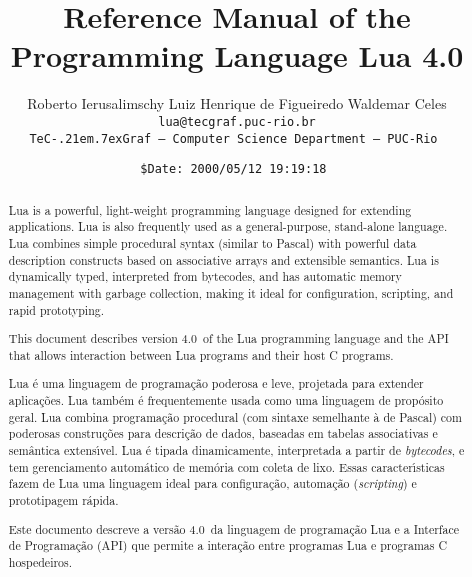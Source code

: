 \documentclass[11pt]{article}
\def\tecgraf{{\sf TeC\kern-.21em\lower.7ex\hbox{Graf}}}
\newcommand{\Version}{4.0}
\begin{document}
\title{Reference Manual of the Programming Language Lua \Version}

\author{%
Roberto Ierusalimschy\quad
Luiz Henrique de Figueiredo\quad
Waldemar Celes
\vspace{1.0ex}\\
\smallskip
\small\tt lua@tecgraf.puc-rio.br
\vspace{2.0ex}\\
\tecgraf\ --- Computer Science Department --- PUC-Rio
}

\date{{\small \tt\$Date: 2000/05/12 19:19:18 $ $}}

\maketitle

\thispagestyle{empty}
\pagestyle{empty}

\begin{abstract}
\noindent
Lua is a powerful, light-weight programming language
designed for extending applications.
Lua is also frequently used as a general-purpose, stand-alone language.
Lua combines simple procedural syntax
(similar to Pascal)
with
powerful data description constructs
based on associative arrays and extensible semantics.
Lua is
dynamically typed,
interpreted from bytecodes,
and has automatic memory management with garbage collection,
making it ideal for
configuration,
scripting,
and
rapid prototyping.

This document describes version \Version\ of the Lua programming language
and the API that allows interaction between Lua programs and their
host C programs.
\end{abstract}

\def\abstractname{Resumo}
\begin{abstract}
\noindent
Lua \'e uma linguagem de programa\c{c}\~ao
poderosa e leve,
projetada para extender aplica\c{c}\~oes.
Lua tamb\'em \'e frequentemente usada como uma linguagem de prop\'osito geral.
Lua combina programa\c{c}\~ao procedural
(com sintaxe semelhante \`a de Pascal)
com
poderosas constru\c{c}\~oes para descri\c{c}\~ao de dados,
baseadas em tabelas associativas e sem\^antica extens\'\i vel.
Lua \'e
tipada dinamicamente,
interpretada a partir de \emph{bytecodes},
e tem gerenciamento autom\'atico de mem\'oria com coleta de lixo.
Essas caracter\'{\i}sticas fazem de Lua uma linguagem ideal para
configura\c{c}\~ao,
automa\c{c}\~ao (\emph{scripting})
e prototipagem r\'apida.

Este documento descreve a vers\~ao \Version\ da linguagem de
programa\c{c}\~ao Lua e a Interface de Programa\c{c}\~ao (API) que permite
a intera\c{c}\~ao entre programas Lua e programas C hospedeiros.
\end{abstract}
\end{document}
